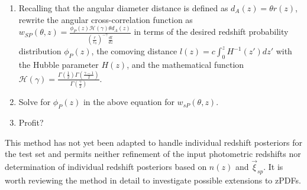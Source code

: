 \documentclass[12pt, onecolumn]{emulateapj}
\begin{document}
\begin{enumerate}
\item Recalling that the angular diameter distance is defined as $d_{A}(z)=\theta r(z)$, rewrite the angular cross-correlation function as $w_{SP}(\theta,z)=\frac{\phi_{P}(z)\mathcal{H}(\gamma)\theta d_{A}(z)}{(\frac{r}{r_{0}})^{-\gamma}\frac{dl}{dz}}$ in terms of the desired redshift probability distribution $\phi_{P}(z)$, the comoving distance $l(z)=c\int_{0}^{z}H^{-1}(z')dz'$ with the Hubble parameter $H(z)$, and the mathematical function $\mathcal{H}(\gamma)=\frac{\Gamma(\frac{1}{2})\Gamma(\frac{\gamma-1}{2})}{\Gamma(\frac{\gamma}{2})}$.

\item Solve for $\phi_{P}(z)$ in the above equation for $w_{sP}(\theta,z)$.

\item Profit?


\end{enumerate}

This method has not yet been adapted to handle individual redshift posteriors for the test set and permits neither refinement of the input photometric redshifts nor determination of individual redshift posteriors based on $n(z)$ and $\vec{\xi}_{sp}$.  It is worth reviewing the method in detail to investigate possible extensions to zPDFs.



\end{document}

